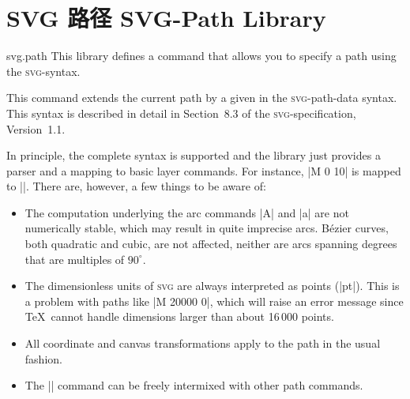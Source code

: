 %
%
%


\section{SVG 路径 SVG-Path Library}
\label{section-library-svg-path}

\begin{pgflibrary}{svg.path}
    This library defines a command that allows you to specify a path using the
    \textsc{svg}-syntax.
\end{pgflibrary}

\begin{command}{\pgfpathsvg{}}
    This command extends the current path by a  given in the
    \textsc{svg}-path-data syntax. This syntax is described in detail in
    Section~8.3 of the \textsc{svg}-specification, Version~1.1.

    In principle, the complete syntax is supported and the library just
    provides a parser and a mapping to basic layer commands. For instance,
    |M 0 10| is mapped to |\pgfpathmoveto{\pgfpoint{0pt}{10pt}}|. There are,
    however, a few things to be aware of:
    \begin{itemize}
        \item The computation underlying the arc commands |A| and |a| are not
            numerically stable, which may result in quite imprecise arcs.
            Bézier curves, both quadratic and cubic, are not affected, neither
            are arcs spanning degrees that are multiples of $90^{\circ}$.
        \item The dimensionless units of \textsc{svg} are always interpreted as
            points (|pt|). This is a problem with paths like |M 20000 0|, which
            will raise an error message since \TeX\ cannot handle dimensions
            larger than about 16\,000 points.
        \item All coordinate and canvas transformations apply to the path in
            the usual fashion.
        \item The |\pgfpathsvg| command can be freely intermixed with other
            path commands.
    \end{itemize}
\begin{codeexample}[preamble={\usepgflibrary{svg.path}}]
\begin{pgfpicture}
\end{pgfpicture}
\end{codeexample}
\end{command}


